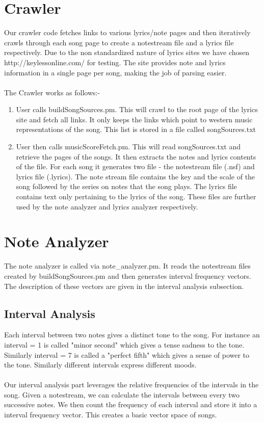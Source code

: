 \documentclass[letterpaper, 11pt]{article}
\begin{document}
\section*{Crawler}
Our crawler code fetches links to various lyrics/note pages and then iteratively crawls through each song page to create a notestream file and a lyrics file respectively. Due to the non standardized nature of lyrics sites we have chosen http://keylessonline.com/ for testing. The site provides note and lyrics information in a single page per song, making the job of parsing easier. \\\\
The Crawler works as follows:-
\begin{enumerate}
\item User calls buildSongSources.pm. This will crawl to the root page of the lyrics site and fetch all links. It only keeps the links which point to western music representations of the song. This list is stored in a file called songSources.txt
\item User then calls musicScoreFetch.pm. This will read songSources.txt and retrieve the pages of the songs. It then extracts the notes and lyrics contents of the file. For each song it generates two file - the notestream file (.nsf) and lyrics file (.lyrics). The note stream file contains the key and the scale of the song followed by the series on notes that the song plays. The lyrics file contains text only pertaining to the lyrics of the song. These files are further used by the note analyzer and lyrics analyzer respectively. 
\end{enumerate}

\section*{Note Analyzer}
The note analyzer is called via note\_analyzer.pm. It reads the notestream files created by buildSongSources.pm and then generates interval frequency vectors. The description of these vectors are given in the interval analysis subsection.
\subsection*{Interval Analysis}
Each interval between two notes gives a distinct tone to the song. For instance an interval = 1  is called "minor second" which gives a tense sadness to the tone. Similarly interval = 7 is called a "perfect fifth" which gives a sense of power to the tone. Similarly different intervals express different moods. \\\\
Our interval analysis part leverages the relative frequencies of the intervals in the song. Given a notestream, we can calculate the intervals between every two successive notes. We then count the frequency of each interval and store it into a interval frequency vector. This creates a basic vector space of songs. 
\end{document}
